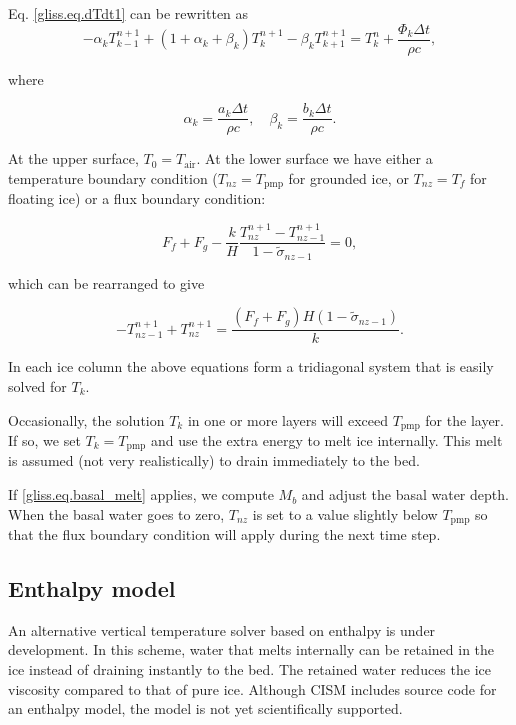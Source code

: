 Eq. \eqref{gliss.eq.dTdt1} can be rewritten as
\begin{equation}
  \label{gliss.eq.dTdt2}
  -{{\alpha }_{k}}T_{k-1}^{n+1} + (1+{{\alpha }_{k}}+{{\beta }_{k}})T_{k}^{n+1} - {{\beta }_{k}}T_{k+1}^{n+1} =
  T_{k}^{n} + \frac{{{\Phi }_{k}}\Delta t}{\rho c},
\end{equation}

\noindent
where

\begin{equation}
   {{\alpha }_{k}}=\frac{{{a}_{k}}\Delta t}{\rho c}, \quad {{\beta }_{k}}=\frac{{{b}_{k}}\Delta t}{\rho c}.
\end{equation}

\noindent
At the upper surface, $T_0 = T_{\mathrm{air}}$.  At the lower surface we have either 
a temperature boundary condition ($T_{nz} = T_{\mathrm{pmp}}$ for grounded ice, or
$T_{nz} = T_f$ for floating ice) or a flux boundary condition:

\begin{equation}
  \label{gliss.eq.lower_flux_bc}
  {{F}_{f}}+{{F}_{g}}-\frac{k}{H}\frac{T_{nz}^{n+1}-T_{nz-1}^{n+1}}{1-{{{\tilde{\sigma }}}_{nz-1}}} = 0,
\end{equation}

\noindent
which can be rearranged to give

\begin{equation}
  \label{gliss.eq.lower_flux_bc2}
  -T_{nz-1}^{n+1}+T_{nz}^{n+1} = \frac{\left( {{F}_{f}}+{{F}_{g}} \right)H\left( 1-{{{\tilde{\sigma }}}_{nz-1}} \right)}{k}.
\end{equation}

\noindent
In each ice column the above equations form a tridiagonal system that is easily solved for $T_k$.

Occasionally, the solution $T_k$ in one or more layers will exceed $T_{\mathrm{pmp}}$ for the layer.
If so, we set $T_k = T_{\mathrm{pmp}}$ and use the extra energy to melt ice internally.
This melt is assumed (not very realistically) to drain immediately to the bed.

If \eqref{gliss.eq.basal_melt} applies, we compute $M_b$ and adjust the basal water depth.
When the basal water goes to zero, $T_{nz}$ is set to a value slightly below $T_{\mathrm{pmp}}$
so that the flux boundary condition will apply during the next time step.

\subsection{Enthalpy model}

An alternative vertical temperature solver based on enthalpy is under development.
In this scheme, water that melts internally can be retained in the ice
instead of draining instantly to the bed. The retained water reduces the ice
viscosity compared to that of pure ice. Although CISM includes source code
for an enthalpy model, the model is not yet scientifically supported.


